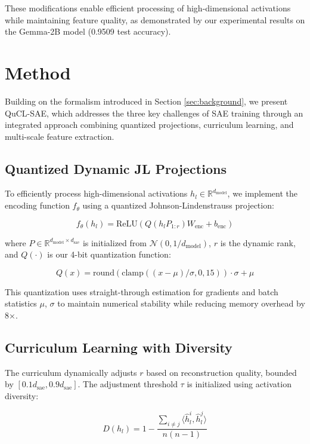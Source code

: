 \documentclass{article} %
\begin{document}
These modifications enable efficient processing of high-dimensional activations while maintaining feature quality, as demonstrated by our experimental results on the Gemma-2B model (0.9509 test accuracy).

\section{Method}
\label{sec:method}

Building on the formalism introduced in Section \ref{sec:background}, we present QuCL-SAE, which addresses the three key challenges of SAE training through an integrated approach combining quantized projections, curriculum learning, and multi-scale feature extraction.

\subsection{Quantized Dynamic JL Projections}
To efficiently process high-dimensional activations $h_l \in \mathbb{R}^{d_{\text{model}}}$, we implement the encoding function $f_{\theta}$ using a quantized Johnson-Lindenstrauss projection:

\begin{equation}
f_{\theta}(h_l) = \text{ReLU}(Q(h_l P_{1:r}) W_{\text{enc}} + b_{\text{enc}})
\end{equation}

where $P \in \mathbb{R}^{d_{\text{model}} \times d_{\text{sae}}}$ is initialized from $\mathcal{N}(0, 1/d_{\text{model}})$, $r$ is the dynamic rank, and $Q(\cdot)$ is our 4-bit quantization function:

\begin{equation}
Q(x) = \text{round}(\text{clamp}((x - \mu)/\sigma, 0, 15)) \cdot \sigma + \mu
\end{equation}

This quantization uses straight-through estimation for gradients and batch statistics $\mu$, $\sigma$ to maintain numerical stability while reducing memory overhead by 8×.

\subsection{Curriculum Learning with Diversity}
The curriculum dynamically adjusts $r$ based on reconstruction quality, bounded by $[0.1d_{\text{sae}}, 0.9d_{\text{sae}}]$. The adjustment threshold $\tau$ is initialized using activation diversity:

\begin{equation}
D(h_l) = 1 - \frac{\sum_{i \neq j} \langle \hat{h}_l^i, \hat{h}_l^j \rangle}{n(n-1)}
\end{equation}
\end{document}
